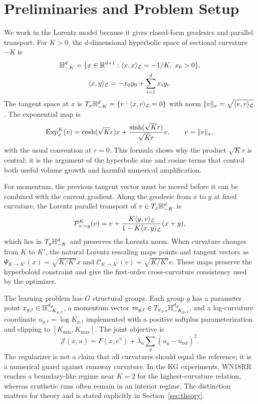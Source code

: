 \section{Preliminaries and Problem Setup}

We work in the Lorentz model because it gives closed-form geodesics and parallel transport. For $K>0$, the $d$-dimensional hyperbolic space of sectional curvature $-K$ is
\begin{equation}
\begin{gathered}
\mathbb{H}_{-K}^{d}=\{x\in\mathbb{R}^{d+1}:\langle x,x\rangle_{\mathcal{L}}=-1/K,\;x_0>0\},\\
\langle x,y\rangle_{\mathcal{L}}=-x_0y_0+\sum_{i=1}^{d}x_iy_i .
\end{gathered}
\end{equation}
The tangent space at $x$ is $T_x\mathbb{H}_{-K}^{d}=\{v:\langle x,v\rangle_{\mathcal{L}}=0\}$ with norm $\|v\|_x=\sqrt{\langle v,v\rangle_{\mathcal{L}}}$. The exponential map is
\begin{equation}
\operatorname{Exp}_x^K(v)=\cosh(\sqrt{K}r)x+\frac{\sinh(\sqrt{K}r)}{\sqrt{K}r}v,\qquad r=\|v\|_x,
\label{eq:exp-main}
\end{equation}
with the usual convention at $r=0$. This formula shows why the product $\sqrt{K}r$ is central: it is the argument of the hyperbolic sine and cosine terms that control both useful volume growth and harmful numerical amplification.

For momentum, the previous tangent vector must be moved before it can be combined with the current gradient. Along the geodesic from $x$ to $y$ at fixed curvature, the Lorentz parallel transport of $v\in T_x\mathbb{H}^d_{-K}$ is
\begin{equation}
\mathcal{P}_{x\to y}^{K}(v)=v+\frac{K\langle y,v\rangle_{\mathcal{L}}}{1-K\langle x,y\rangle_{\mathcal{L}}}(x+y),
\label{eq:pt-main}
\end{equation}
which lies in $T_y\mathbb{H}^d_{-K}$ and preserves the Lorentz norm. When curvature changes from $K$ to $K'$, the natural Lorentz rescaling maps points and tangent vectors as $\Psi_{K\to K'}(x)=\sqrt{K/K'}x$ and $\mathcal{C}_{K\to K'}(v)=\sqrt{K/K'}v$. These maps preserve the hyperboloid constraint and give the first-order cross-curvature consistency used by the optimizer.

The learning problem has $G$ structural groups. Each group $g$ has a parameter point $x_{g,t}\in\mathbb{H}^{d_g}_{-K_{g,t}}$, a momentum vector $m_{g,t}\in T_{x_{g,t}}\mathbb{H}^{d_g}_{-K_{g,t}}$, and a log-curvature coordinate $u_{g,t}=\log K_{g,t}$ implemented with a positive softplus parameterization and clipping to $[K_{\min},K_{\max}]$. The joint objective is
\begin{equation}
\mathcal{J}(x,u)=F(x,e^u)+\lambda_u\sum_g (u_g-u_{\mathrm{ref}})^2.
\label{eq:joint-main}
\end{equation}
The regularizer is not a claim that all curvatures should equal the reference; it is a numerical guard against runaway curvature. In the KG experiments, WN18RR reaches a boundary-like regime near $K=2$ for the highest-curvature relation, whereas synthetic runs often remain in an interior regime. The distinction matters for theory and is stated explicitly in Section~\ref{sec:theory}.

